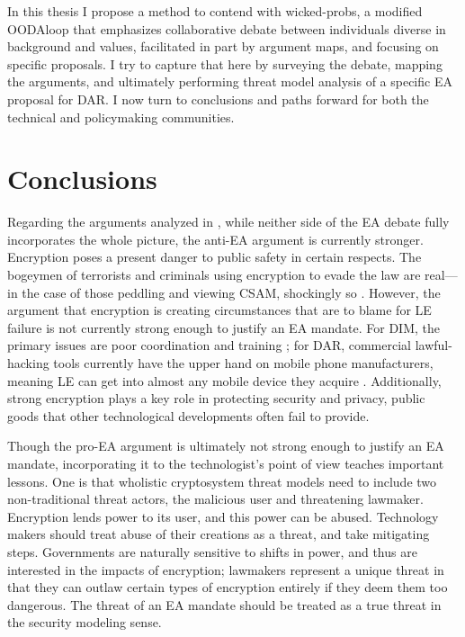 In this thesis I propose a method to contend with \acp{wicked-prob}, a modified \ac{OODAloop} that emphasizes
collaborative debate between individuals diverse in background and values, facilitated in part by argument maps, and
focusing on specific proposals. I try to capture that here by surveying the debate, mapping the arguments, and
ultimately performing threat model analysis of a specific \ac{EA} proposal for \acl{DAR}. I now turn to conclusions and
paths forward for both the technical and policymaking communities.


\section{Conclusions}

Regarding the arguments analyzed in , while neither side of the \ac{EA} debate fully incorporates
the whole picture, the anti-\ac{EA} argument is currently stronger. Encryption poses a present danger to public safety
in certain respects. The bogeymen of terrorists and criminals using encryption to evade the law are real---in the case
of those peddling and viewing \acl{CSAM}, shockingly so \cite{keller_internet_2019}. However, the argument that
\ac{encryption} is creating circumstances that are to blame for \acl{LE} failure is not currently strong enough to
justify an \ac{EA} mandate. For \ac{DIM}, the primary issues are poor coordination and training \cite{carter_2018}; for
\ac{DAR}, commercial \ac{lawful-hacking} tools currently have the upper hand on mobile phone manufacturers, meaning
\acl{LE} can get into almost any mobile device they acquire \cite{koepke_2020}. Additionally, strong \ac{encryption}
plays a key role in protecting security and privacy, public goods that other technological developments often fail to
provide.

Though the pro-\ac{EA} argument is ultimately not strong enough to justify an \ac{EA} mandate, incorporating it to the
technologist's point of view teaches important lessons. One is that wholistic cryptosystem threat models need to include
two non-traditional threat actors, the malicious user and threatening lawmaker. Encryption lends power to its user, and
this power can be abused. Technology makers should treat abuse of their creations as a threat, and take mitigating
steps. Governments are naturally sensitive to shifts in power, and thus are interested in the impacts of encryption;
lawmakers represent a unique threat in that they can outlaw certain types of encryption entirely if they deem them too
dangerous. The threat of an \ac{EA} mandate should be treated as a true threat in the security modeling sense.

